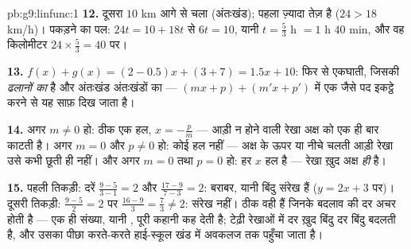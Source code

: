 \begin{solution}{pb:g9:linfunc:1}
\textbf{12.} दूसरा $10$ km आगे से चला (अंतःखंड); पहला ज़्यादा तेज़ है
($24 > 18$ km/h)। पकड़ने का पल: $24t = 10 + 18t$ से $6t = 10$, यानी
$t = \frac53$ h $= 1$ h $40$ min, और वह किलोमीटर
$24 \times \frac53 = 40$ पर।

\textbf{13.} $f(x) + g(x) = (2 - 0.5)x + (3 + 7) = 1.5x + 10$: फिर
से एकघाती, जिसकी  \emph{ढलानों का } है और अंतःखंड अंतःखंडों
का  --- $(mx + p) + (m'x + p')$ में एक जैसे पद इकट्ठे करने से यह
साफ़ दिख जाता है।

\textbf{14.} अगर $m \neq 0$ हो: ठीक एक हल, $x = -\frac pm$ --- आड़ी
न होने वाली रेखा अक्ष को एक ही बार काटती है। अगर $m = 0$ और
$p \neq 0$ हो: कोई हल नहीं --- अक्ष के ऊपर या नीचे चलती आड़ी रेखा उसे
कभी छूती ही नहीं। और अगर $m = 0$ तथा $p = 0$ हो: हर $x$ हल है ---
रेखा ख़ुद अक्ष \emph{ही} है।

\textbf{15.} पहली तिकड़ी: दरें $\frac{9 - 5}{3 - 1} = 2$ और
$\frac{17 - 9}{7 - 3} = 2$: बराबर, यानी बिंदु संरेख हैं
($y = 2x + 3$ पर)। दूसरी तिकड़ी: $\frac{9-5}{2} = 2$ पर
$\frac{16 - 9}{3} = \frac73 \neq 2$: संरेख नहीं।  ठीक वही
हैं जिनके बदलाव की दर अचर होती है --- एक ही संख्या, यानी , पूरी
कहानी कह देती है; टेढ़ी रेखाओं में दर ख़ुद बिंदु दर बिंदु बदलती है, और
उसका पीछा करते-करते हाई-स्कूल खंड में अवकलज तक पहुँचा जाता है।

\end{solution}
